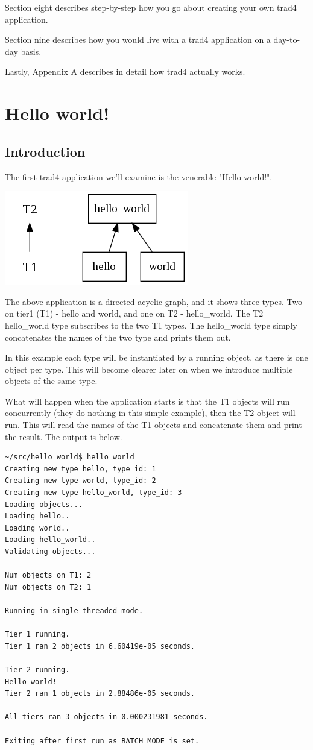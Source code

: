 \documentclass{report}
\begin{document}
Section eight describes step-by-step how you go about creating your own trad4 application.

Section nine describes how you would live with a trad4 application on a day-to-day basis.

Lastly, Appendix A describes in detail how trad4 actually works.


\chapter{Hello world!}

\section{Introduction}

The first trad4 application we'll examine is the venerable "Hello world!".

\includegraphics[scale=0.5]{helloworldabstract.png}

The above application is a directed acyclic graph, and it shows three types. Two on tier1 (T1) - hello and world, and one on T2 - hello_world. The T2 hello_world type subscribes to the two T1 types. The hello_world type simply concatenates the names of the two type and prints them out.

In this example each type will be instantiated by a running object, as there is one object per type. This will become clearer later on when we introduce multiple objects of the same type.

What will happen when the application starts is that the T1 objects will run concurrently (they do nothing in this simple example), then the T2 object will run. This will read the names of the T1 objects and concatenate them and print the result. The output is below.

\begin{verbatim}
~/src/hello_world$ hello_world
Creating new type hello, type_id: 1
Creating new type world, type_id: 2
Creating new type hello_world, type_id: 3
Loading objects...
Loading hello..
Loading world..
Loading hello_world..
Validating objects...

Num objects on T1: 2
Num objects on T2: 1

Running in single-threaded mode.

Tier 1 running.
Tier 1 ran 2 objects in 6.60419e-05 seconds.

Tier 2 running.
Hello world!
Tier 2 ran 1 objects in 2.88486e-05 seconds.

All tiers ran 3 objects in 0.000231981 seconds.

Exiting after first run as BATCH_MODE is set.
\end{verbatim}
\end{document}
